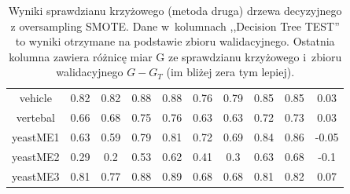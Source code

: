 \begin{table}[h]
\begin{center}
{\begin{tabular}{|c|c|c|c|c|c|c|c|c|c|}
			vehicle&0.82&0.82&0.88&0.88&0.76&0.79&0.85&0.85&0.03\\%
			vertebal&0.66&0.68&0.75&0.76&0.63&0.63&0.72&0.73&0.03\\%
			yeastME1&0.63&0.59&0.79&0.81&0.72&0.69&0.84&0.86&{-}0.05\\%
			yeastME2&0.29&0.2&0.53&0.62&0.41&0.3&0.63&0.68&{-}0.1\\%
			yeastME3&0.81&0.77&0.88&0.89&0.68&0.68&0.81&0.82&0.07\\%
			\hline%
		\end{tabular}}%
			\caption[Wyniki sprawdzianu krzyżowego z metodą SMOTE, metoda druga]{Wyniki sprawdzianu krzyżowego (metoda druga) drzewa decyzyjnego z oversampling SMOTE. Dane w~kolumnach ,,Decision Tree TEST'' to wyniki otrzymane na podstawie zbioru walidacyjnego. Ostatnia kolumna zawiera różnicę  miar G ze sprawdzianu krzyżowego i~zbioru walidacyjnego $G-G_T$ (im bliżej zera tym lepiej).}
			\label{CVoversampling2}
	\end{center}
\end{table}